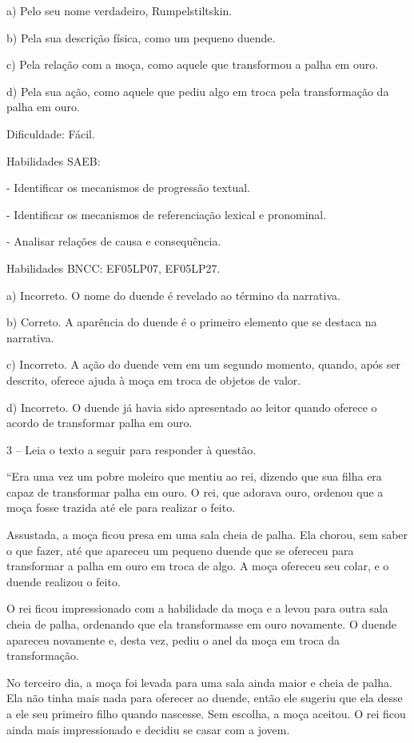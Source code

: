 a) Pelo seu nome verdadeiro, Rumpelstiltskin.

b) Pela sua descrição física, como um pequeno duende.

c) Pela relação com a moça, como aquele que transformou a palha em ouro.

d) Pela sua ação, como aquele que pediu algo em troca pela transformação
da palha em ouro.

Dificuldade: Fácil.

Habilidades SAEB:

- Identificar os mecanismos de progressão textual.

- Identificar os mecanismos de referenciação lexical e pronominal.

- Analisar relações de causa e consequência.

Habilidades BNCC: EF05LP07, EF05LP27.

a) Incorreto. O nome do duende é revelado ao término da narrativa.

b) Correto. A aparência do duende é o primeiro elemento que se destaca
na narrativa.

c) Incorreto. A ação do duende vem em um segundo momento, quando, após
ser descrito, oferece ajuda à moça em troca de objetos de valor.

d) Incorreto. O duende já havia sido apresentado ao leitor quando
oferece o acordo de transformar palha em ouro.

3 -- Leia o texto a seguir para responder à questão.

``Era uma vez um pobre moleiro que mentiu ao rei, dizendo que sua filha
era capaz de transformar palha em ouro. O rei, que adorava ouro, ordenou
que a moça fosse trazida até ele para realizar o feito.

Assustada, a moça ficou presa em uma sala cheia de palha. Ela chorou,
sem saber o que fazer, até que apareceu um pequeno duende que se
ofereceu para transformar a palha em ouro em troca de algo. A moça
ofereceu seu colar, e o duende realizou o feito.

O rei ficou impressionado com a habilidade da moça e a levou para outra
sala cheia de palha, ordenando que ela transformasse em ouro novamente.
O duende apareceu novamente e, desta vez, pediu o anel da moça em troca
da transformação.

No terceiro dia, a moça foi levada para uma sala ainda maior e cheia de
palha. Ela não tinha mais nada para oferecer ao duende, então ele
sugeriu que ela desse a ele seu primeiro filho quando nascesse. Sem
escolha, a moça aceitou. O rei ficou ainda mais impressionado e decidiu
se casar com a jovem.

